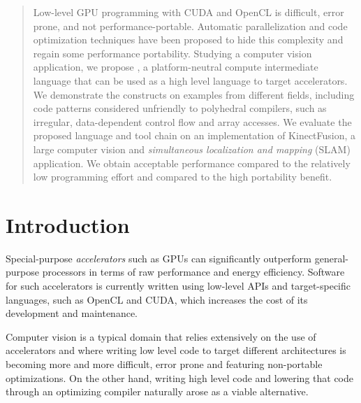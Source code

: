 \documentclass{llncs}
\begin{document}
%
\frontmatter          %
\pagestyle{headings}  %
\mainmatter           %
%
\title{}

%
\author{}


\maketitle{}

\begin{abstract}
  Low-level GPU programming with CUDA and OpenCL is difficult, error
  prone, and not performance-portable. Automatic parallelization
  and code optimization techniques have been proposed
  to hide this complexity and regain some performance portability.
  Studying a computer vision application, we propose
  \pencil{}, a platform-neutral compute intermediate language that can
  be used as a high level language to target accelerators.
  We demonstrate the \pencil{} constructs on examples from different
  fields, including code patterns considered unfriendly to polyhedral
  compilers, such as irregular, data-dependent control flow and array
  accesses.
  We evaluate the proposed language and tool chain on an implementation
  of KinectFusion, a large computer vision and \textit{simultaneous
  localization and mapping} (SLAM) application.
  We obtain acceptable performance compared to the relatively low
  programming effort and compared to the high portability benefit.
\end{abstract}

\section{Introduction}

Special-purpose \emph{accelerators} such as GPUs can significantly
outperform general-purpose processors in terms of raw performance and
energy efficiency.  Software for such accelerators is currently
written using low-level APIs and target-specific languages, such as
OpenCL and CUDA, which increases the cost of its development and
maintenance.

Computer vision is a typical domain that relies extensively on the
use of accelerators and where writing low level code to target
different architectures is becoming more and more difficult, error
prone and featuring non-portable optimizations.
On the other hand, writing high level code and lowering that code
through an optimizing compiler naturally arose as a viable alternative.
\end{document}
